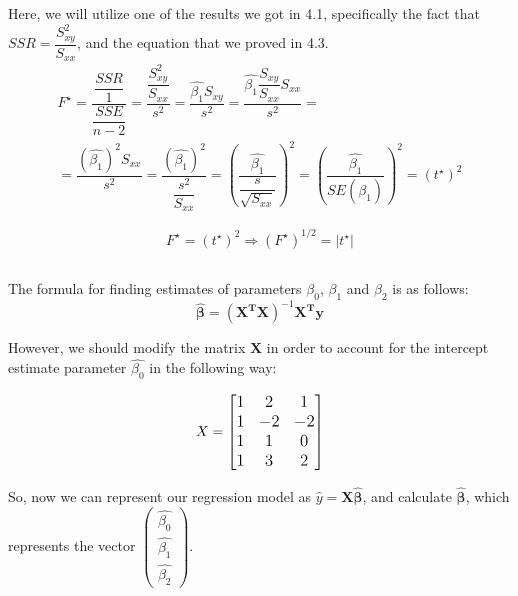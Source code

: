 \documentclass{homework2_template}
\begin{document}
\subsection{}

Here, we will utilize one of the results we got in 4.1, specifically the fact that $SSR = \dfrac{S_{xy}^2}{S_{xx}}$, and the equation that we proved in 4.3.
\begin{equation*}
\begin{gathered} 
F^\star = \dfrac{\dfrac{SSR}{1}}{\dfrac{SSE}{n-2}} = \dfrac{\dfrac{S_{xy}^2}{S_{xx}}}{s^2} = \dfrac{\hat{\beta_1}S_{xy}}{s^2} = \dfrac{\hat{\beta_1}\dfrac{S_{xy}}{S_{xx}}S_{xx}}{s^2} = \\ = \dfrac{(\hat{\beta_1})^2 S_{xx}}{s^2} = \dfrac{(\hat{\beta_1})^2}{\dfrac{s^2}{S_{xx}}} = \left(\dfrac{\hat{\beta_1}}{\dfrac{s}{\sqrt{S_{xx}}}}\right)^2 = \left(\dfrac{\hat{\beta_1}}{SE(\hat{\beta_1})}\right)^2 = (t^\star)^2
\end{gathered}
\end{equation*}

\begin{equation*}
F^\star = (t^\star)^2 \Rightarrow (F^\star)^{1/2} = |t^\star|    
\end{equation*}

\exercise{}
\subsection{}
The formula for finding estimates of parameters $\beta_0$, $\beta_1$ and $\beta_2$ is as follows:
\[ \bm{\hat{\beta}} = (\bm{X^TX})^{-1}\bm{X^Ty} \]

However, we should modify the matrix $\bm{X}$ in order to account for the intercept estimate parameter $\hat{\beta_0}$ in the following way:

\begin{equation*}
{\large
X = 
\begin{bmatrix}
 1 & 2 & 1 \\
 1 & -2 & -2 \\
 1 & 1 & 0 \\
 1 & 3 & 2
\end{bmatrix}
}
\end{equation*}

So, now we can represent our regression model as $\hat{y} = \bm{X\hat{\beta}}$, and calculate $\bm{\hat{\beta}}$, which represents the vector  $\begin{pmatrix}
   \hat{\beta_0} \\ 
   \hat{\beta_1} \\
   \hat{\beta_2}
\end{pmatrix}$.
\end{document}
